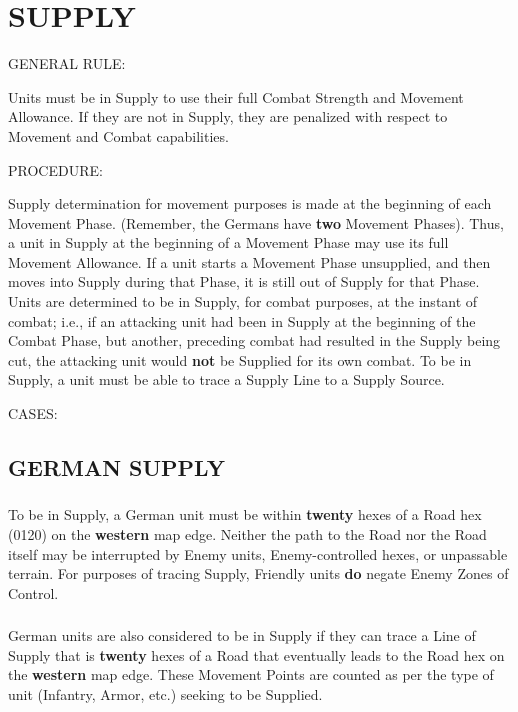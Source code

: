 \section{SUPPLY}

GENERAL RULE:

Units must be in Supply to use their full Combat Strength and Movement Allowance. If they are not in Supply, they are penalized with respect to Movement and Combat capabilities.

PROCEDURE:

Supply determination for movement purposes is made at the beginning of each Movement Phase. (Remember, the Germans have \textbf{two} Movement Phases). Thus, a unit in Supply at the beginning of a Movement Phase may use its full Movement Allowance. If a unit starts a Movement Phase unsupplied, and then moves into Supply during that Phase, it is still out of Supply for that Phase. Units are determined to be in Supply, for combat purposes, at the instant of combat; i.e., if an attacking unit had been in Supply at the beginning of the Combat Phase, but another, preceding combat had resulted in the Supply being cut, the attacking unit would \textbf{not} be Supplied for its own combat. To be in Supply, a unit must be able to trace a Supply Line to a Supply Source.

CASES:

\subsection{GERMAN SUPPLY}

\subsubsection{} To be in Supply, a German unit must be within \textbf{twenty} hexes of a Road hex (0120) on the \textbf{western} map edge. Neither the path to the Road nor the Road itself may be interrupted by Enemy units, Enemy-controlled hexes, or unpassable terrain. For purposes of tracing Supply, Friendly units \textbf{do} negate Enemy Zones of Control.

\subsubsection{} German units are also considered to be in Supply if they can trace a Line of Supply that is \textbf{twenty} hexes of a Road that eventually leads to the Road hex on the \textbf{western} map edge. These Movement Points are counted as per the type of unit (Infantry, Armor, etc.) seeking to be Supplied.


